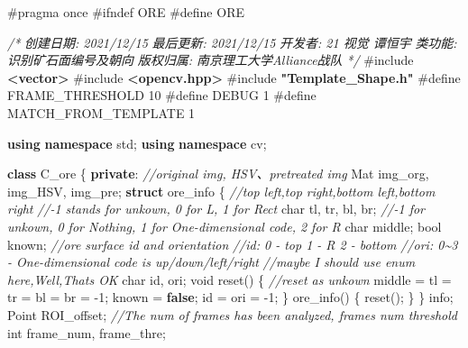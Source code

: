 \documentclass[
]{article}
\newenvironment{Shaded}{}{}
\newcommand{\CommentTok}[1]{\textcolor[rgb]{0.38,0.63,0.69}{\textit{#1}}}
\newcommand{\DataTypeTok}[1]{\textcolor[rgb]{0.56,0.13,0.00}{#1}}
\newcommand{\DecValTok}[1]{\textcolor[rgb]{0.25,0.63,0.44}{#1}}
\newcommand{\FunctionTok}[1]{\textcolor[rgb]{0.02,0.16,0.49}{#1}}
\newcommand{\ImportTok}[1]{\textcolor[rgb]{0.00,0.50,0.00}{\textbf{#1}}}
\newcommand{\KeywordTok}[1]{\textcolor[rgb]{0.00,0.44,0.13}{\textbf{#1}}}
\newcommand{\NormalTok}[1]{#1}
\newcommand{\OperatorTok}[1]{\textcolor[rgb]{0.40,0.40,0.40}{#1}}
\newcommand{\PreprocessorTok}[1]{\textcolor[rgb]{0.74,0.48,0.00}{#1}}
\begin{document}
\begin{Shaded}
\begin{Highlighting}[]
\PreprocessorTok{\#pragma once}
\PreprocessorTok{\#ifndef ORE}
\PreprocessorTok{\#define ORE}

\CommentTok{/*}
\CommentTok{创建日期:	2021/12/15}
\CommentTok{最后更新:	2021/12/15}
\CommentTok{开发者:	21 视觉 谭恒宇}
\CommentTok{类功能:	识别矿石面编号及朝向}
\CommentTok{版权归属:	南京理工大学Alliance战队}
\CommentTok{*/}
\PreprocessorTok{\#include }\ImportTok{\textless{}vector\textgreater{}}
\PreprocessorTok{\#include }\ImportTok{\textless{}opencv.hpp\textgreater{}}
\PreprocessorTok{\#include }\ImportTok{"Template\_Shape.h"}
\PreprocessorTok{\#define FRAME\_THRESHOLD }\DecValTok{10}
\PreprocessorTok{\#define DEBUG }\DecValTok{1}
\PreprocessorTok{\#define MATCH\_FROM\_TEMPLATE }\DecValTok{1}

\KeywordTok{using} \KeywordTok{namespace}\NormalTok{ std}\OperatorTok{;}
\KeywordTok{using} \KeywordTok{namespace}\NormalTok{ cv}\OperatorTok{;}

\KeywordTok{class}\NormalTok{ C\_ore }\OperatorTok{\{}
\KeywordTok{private}\OperatorTok{:}
	\CommentTok{//original img, HSV、pretreated img}
\NormalTok{	Mat img\_org}\OperatorTok{,}\NormalTok{ img\_HSV}\OperatorTok{,}\NormalTok{ img\_pre}\OperatorTok{;}
	\KeywordTok{struct}\NormalTok{ ore\_info }\OperatorTok{\{}
		\CommentTok{//top left,top right,bottom left,bottom right}
		\CommentTok{//{-}1 stands for unkown, 0 for \textquotesingle{}L\textquotesingle{}, 1 for Rect}
		\DataTypeTok{char}\NormalTok{ tl}\OperatorTok{,} \FunctionTok{tr}\OperatorTok{,}\NormalTok{ bl}\OperatorTok{,}\NormalTok{ br}\OperatorTok{;} 
		\CommentTok{//{-}1 for unkown, 0 for Nothing, 1 for One{-}dimensional code, 2 for \textquotesingle{}R\textquotesingle{}}
		\DataTypeTok{char}\NormalTok{ middle}\OperatorTok{;}
		\DataTypeTok{bool}\NormalTok{ known}\OperatorTok{;}
		\CommentTok{//ore surface id and orientation}
		\CommentTok{//id: 0 {-} top 1 {-} \textquotesingle{}R\textquotesingle{} 2 {-} bottom}
		\CommentTok{//ori: 0\textasciitilde{}3 {-} One{-}dimensional code is up/down/left/right}
		\CommentTok{//maybe I should use enum here,Well,That\textquotesingle{}s OK}
		\DataTypeTok{char}\NormalTok{ id}\OperatorTok{,}\NormalTok{ ori}\OperatorTok{;}
		\DataTypeTok{void}\NormalTok{ reset}\OperatorTok{()} \OperatorTok{\{}
			\CommentTok{//reset as unkown}
\NormalTok{			middle }\OperatorTok{=}\NormalTok{ tl }\OperatorTok{=} \FunctionTok{tr} \OperatorTok{=}\NormalTok{ bl }\OperatorTok{=}\NormalTok{ br }\OperatorTok{=} \OperatorTok{{-}}\DecValTok{1}\OperatorTok{;}
\NormalTok{			known }\OperatorTok{=} \KeywordTok{false}\OperatorTok{;}
\NormalTok{			id }\OperatorTok{=}\NormalTok{ ori }\OperatorTok{=} \OperatorTok{{-}}\DecValTok{1}\OperatorTok{;}
		\OperatorTok{\}}
\NormalTok{		ore\_info}\OperatorTok{()} \OperatorTok{\{}\NormalTok{ reset}\OperatorTok{();} \OperatorTok{\}}
	\OperatorTok{\}}\NormalTok{ info}\OperatorTok{;}
\NormalTok{	Point ROI\_offset}\OperatorTok{;}
	\CommentTok{//The num of frames has been analyzed, frames num threshold}
	\DataTypeTok{int}\NormalTok{ frame\_num}\OperatorTok{,}\NormalTok{ frame\_thre}\OperatorTok{;}


\end{Highlighting}
\end{Shaded}
\end{document}
